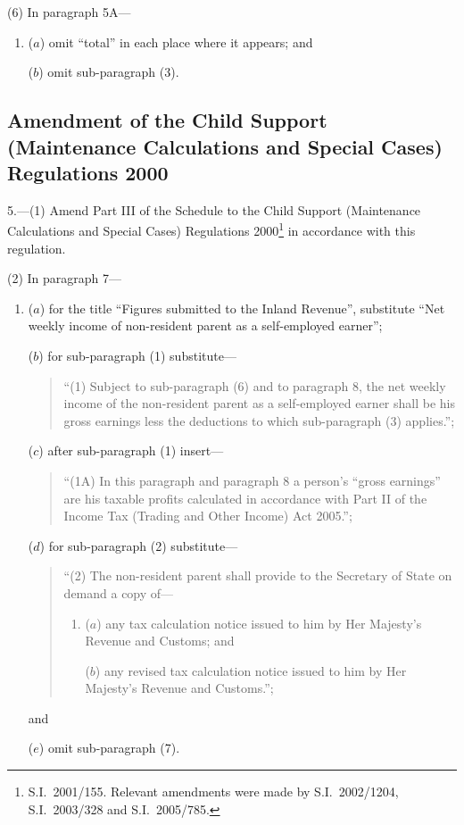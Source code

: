 \documentclass[12pt,a4paper]{article}
\begin{document}
(6) In paragraph 5A—
\begin{enumerate}\item[]
($a$) omit “total” in each place where it appears; and

($b$) omit sub-paragraph (3).
\end{enumerate}

\subsection[5. Amendment of the Child Support (Maintenance Calculations and Special Cases) Regulations 2000]{Amendment of the Child Support (Maintenance Calculations and Special Cases) Regulations 2000
}

5.---(1)  Amend Part III of the Schedule to the Child Support (Maintenance Calculations and Special Cases) Regulations 2000\footnote{S.I.\ 2001/155. Relevant amendments were made by S.I.\ 2002/1204, S.I.\ 2003/328 and S.I.\ 2005/785.} in accordance with this regulation.

(2) In paragraph 7—
\begin{enumerate}\item[]
($a$) for the title “Figures submitted to the Inland Revenue”, substitute “Net weekly income of non-resident parent as a self-employed earner”;

($b$) for sub-paragraph (1) substitute—
\begin{quotation}
“(1) Subject to sub-paragraph (6) and to paragraph 8, the net weekly income of the non-resident parent as a self-employed earner shall be his gross earnings less the deductions to which sub-paragraph (3) applies.”;
\end{quotation}

($c$) after sub-paragraph (1) insert—
\begin{quotation}
“(1A) In this paragraph and paragraph 8 a person’s “gross earnings” are his taxable profits calculated in accordance with Part II of the Income Tax (Trading and Other Income) Act 2005.”;
\end{quotation}

($d$) for sub-paragraph (2) substitute—
\begin{quotation}
“(2) The non-resident parent shall provide to the Secretary of State on demand a copy of—
\begin{enumerate}\item[]
($a$) any tax calculation notice issued to him by Her Majesty’s Revenue and Customs; and

($b$) any revised tax calculation notice issued to him by Her Majesty’s Revenue and Customs.”;
\end{enumerate}
\end{quotation}

and

($e$) omit sub-paragraph (7).
\end{enumerate}
\end{document}
